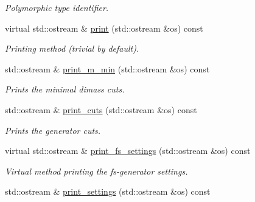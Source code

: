 \begin{DoxyCompactItemize}
\begin{DoxyCompactList}\small\item\em Polymorphic type identifier. \end{DoxyCompactList}\item 
\hypertarget{a00441_a3de071389117363181d3aeb95c620c40}{virtual std\-::ostream \& \hyperlink{a00441_a3de071389117363181d3aeb95c620c40}{print} (std\-::ostream \&os) const }\label{a00441_a3de071389117363181d3aeb95c620c40}

\begin{DoxyCompactList}\small\item\em Printing method (trivial by default). \end{DoxyCompactList}\item 
\hypertarget{a00441_ad5f3de673fb4b1e15fa5ce22e45a49e2}{std\-::ostream \& \hyperlink{a00441_ad5f3de673fb4b1e15fa5ce22e45a49e2}{print\-\_\-m\-\_\-min} (std\-::ostream \&os) const }\label{a00441_ad5f3de673fb4b1e15fa5ce22e45a49e2}

\begin{DoxyCompactList}\small\item\em Prints the minimal dimass cuts. \end{DoxyCompactList}\item 
\hypertarget{a00441_acb959afdb2677f3d8e14c122cf82cc8e}{std\-::ostream \& \hyperlink{a00441_acb959afdb2677f3d8e14c122cf82cc8e}{print\-\_\-cuts} (std\-::ostream \&os) const }\label{a00441_acb959afdb2677f3d8e14c122cf82cc8e}

\begin{DoxyCompactList}\small\item\em Prints the generator cuts. \end{DoxyCompactList}\item 
\hypertarget{a00441_ad624214090c7af05dea86e49898e416f}{virtual std\-::ostream \& \hyperlink{a00441_ad624214090c7af05dea86e49898e416f}{print\-\_\-fs\-\_\-settings} (std\-::ostream \&os) const }\label{a00441_ad624214090c7af05dea86e49898e416f}

\begin{DoxyCompactList}\small\item\em Virtual method printing the fs-\/generator settings. \end{DoxyCompactList}\item 
\hypertarget{a00441_afe993ba556fa067fcb43d991d3de9bb9}{std\-::ostream \& \hyperlink{a00441_afe993ba556fa067fcb43d991d3de9bb9}{print\-\_\-settings} (std\-::ostream \&os) const }\label{a00441_afe993ba556fa067fcb43d991d3de9bb9}


\end{DoxyCompactItemize}
